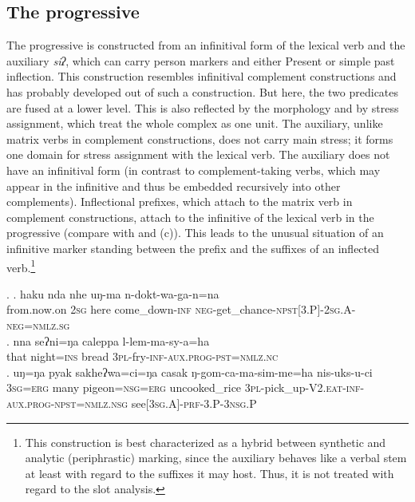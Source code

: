 		
\subsection{The  progressive}\label{progressive}

The  progressive is constructed from an infinitival form of the lexical verb and the auxiliary \emph{siʔ}, which can carry person markers and  either Present or  simple past inflection. This construction resembles infinitival complement constructions and has probably developed out of such a construction. But here, the two predicates are fused at a lower level. This is also reflected by the morphology and by stress assignment, which treat the whole complex as one unit. The auxiliary, unlike matrix verbs in complement constructions, does not carry main stress; it forms one domain for stress assignment with the lexical verb. The auxiliary does not have an infinitival form (in contrast to complement-taking verbs, which may appear in the infinitive and thus be embedded recursively into other complements). Inflectional prefixes, which attach to the matrix verb in complement constructions, attach to the infinitive of the lexical verb in the progressive (compare \Next[a] with \Next[b] and (c)). This leads to the unusual situation of an infinitive marker standing between the prefix and the suffixes of an inflected verb.\footnote{This construction is best characterized as a hybrid between synthetic and analytic (periphrastic) marking, since the auxiliary behaves like a verbal stem at least with regard to the suffixes it may host. Thus, it is not treated with regard to the slot analysis.} 


\ex. \ag. haku nda nhe uŋ-ma n-dokt-wa-ga-n=na\\
		from.now.on {\scshape 2sg} here come\_down{\scshape -inf} {\scshape neg-}get\_chance{\scshape -npst[3.P]-2sg.A-neg=nmlz.sg}	\\
	 
 	\bg. nna  seʔni=ŋa       caleppa l-lem-ma-sy-a=ha\\ 
		that night{\scshape =ins} bread {\scshape 3pl-}fry{\scshape -inf-aux.prog-pst=nmlz.nc}\\
	  
	\bg. uŋ=ŋa   pyak sakheʔwa=ci=ŋa     casak ŋ-gom-ca-ma-sim-me=ha nis-uks-u-ci\\
 {\scshape 3sg=erg} many  pigeon{\scshape =nsg=erg} uncooked\_rice  {\scshape 3pl}-pick\_up{\scshape -V2.eat-inf-aux.prog-npst=nmlz.nsg} see{\scshape [3sg.A]-prf-3.P-3nsg.P}\\
 



